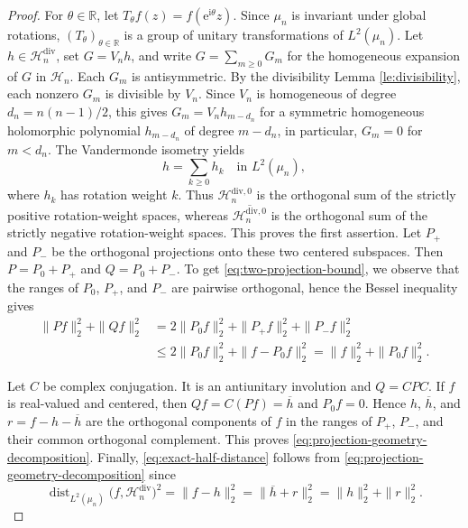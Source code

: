 \documentclass[10pt,a4paper]{amsart}
\begin{document}
\begin{proof}
  For $\theta\in\mathbb{R}$, let
  $T_\theta f(z)=f(\mathrm{e}^{\mathrm{i}\theta}z)$. Since $\mu_n$ is
  invariant under global rotations, ${(T_\theta)}_{\theta\in\mathbb{R}}$ is a
  group of unitary transformations of $L^2(\mu_n)$. Let
  $h\in\mathcal{H}_n^{\mathrm{div}}$, set $G=V_nh$, and write
  $G=\sum_{m\geq0}G_m$ for the homogeneous expansion of $G$ in
  $\mathcal{H}_n$. Each $G_m$ is antisymmetric. By the divisibility Lemma
  \ref{le:divisibility}, each nonzero $G_m$ is divisible by $V_n$. Since $V_n$
  is homogeneous of degree $d_n=n(n-1)/2$, this gives $G_m=V_nh_{m-d_n}$ for a
  symmetric homogeneous holomorphic polynomial $h_{m-d_n}$ of degree $m-d_n$,
  in particular, $G_m=0$ for $m<d_n$. The Vandermonde isometry yields
  \[
    h=\sum_{k\geq0}h_k
    \quad\text{in }L^2(\mu_n),
  \]
  where $h_k$ has rotation weight $k$. Thus $\mathcal{H}_n^{\mathrm{div},0}$
  is the orthogonal sum of the strictly positive rotation-weight spaces,
  whereas $\overline{\mathcal{H}_n^{\mathrm{div},0}}$ is the orthogonal sum of
  the strictly negative rotation-weight spaces. This proves the first
  assertion. Let $P_+$ and $P_-$ be the orthogonal projections onto these two
  centered subspaces. Then $P=P_0+P_+$ and $Q=P_0+P_-$. To get
  \eqref{eq:two-projection-bound}, we observe that the ranges of $P_0$, $P_+$,
  and $P_-$ are pairwise orthogonal, hence the Bessel inequality gives
  \begin{align*}
    \|Pf\|_2^2+\|Qf\|_2^2
    &=2\|P_0f\|_2^2+\|P_+f\|_2^2+\|P_-f\|_2^2\\
    &\leq2\|P_0f\|_2^2+\|f-P_0f\|_2^2
      =\|f\|_2^2+\|P_0f\|_2^2.
  \end{align*}

  Let $C$ be complex conjugation. It is an antiunitary involution and $Q=CPC$.
  If $f$ is real-valued and centered, then $Qf=C(Pf)=\overline h$ and
  $P_0f=0$. Hence $h$, $\overline h$, and $r=f-h-\overline h$ are the
  orthogonal components of $f$ in the ranges of $P_+$, $P_-$, and their common
  orthogonal complement. This proves
  \eqref{eq:projection-geometry-decomposition}. Finally,
  \eqref{eq:exact-half-distance} follows from
  \eqref{eq:projection-geometry-decomposition} since
  \[
    \operatorname{dist}_{L^2(\mu_n)}
    \bigl(f,\mathcal{H}_n^{\mathrm{div}}\bigr)^2
    =\|f-h\|_2^2
    =\|\overline h+r\|_2^2
    =\|h\|_2^2+\|r\|_2^2.
  \]
\end{proof}
\end{document}
